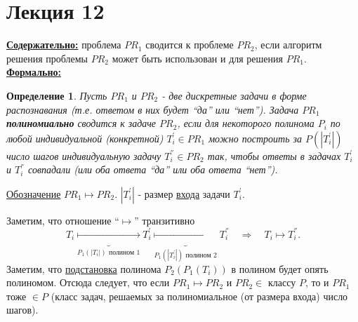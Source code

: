 \documentclass{article}
\newtheorem{definition}{Определение}
\numberwithin{example}{section}
\numberwithin{question}{section}
\numberwithin{Remark}{section}
\numberwithin{theorem}{section}
\numberwithin{definition}{section}
\numberwithin{proposition}{section}
\begin{document}
\section{Лекция 12}
\underline{\textbf{Содержательно:}} проблема $PR_1$ сводится к проблеме $PR_2$, если алгоритм решения проблемы $PR_2$ может быть использован и для решения $PR_1$.\\
\underline{\textbf{Формально:}} 
\begin{definition}
	Пусть $PR_1$ и $PR_2$ - две дискретные задачи в форме распознавания (т.е. ответом в них будет ``да'' или ``нет''). Задача $PR_1$ \textbf{полиномиально} сводится к задаче $PR_2$, если для некоторого полинома $P_i$ по любой индивидуальной (конкретной) $T_i^{'}\in PR_1$ можно построить за $P(|T_i^{'}|)$ число шагов индивидуальную задачу $T_i^{''}\in PR_2$ так, чтобы ответы в задачах $T_i^{'}$ и $T_i^{''}$ совпадали (или оба ответа ``да'' или оба ответа ``нет'').
\end{definition}
\underline{Обозначение} $PR_1\mapsto PR_2$. $|T_i^{'}|$ - размер \underline{входа} задачи $T_i^{'}$.

Заметим, что отношение ``$\mapsto$'' транзитивно
\begin{equation*}
T_i\underbrace{\mapsto}_{P_1(|T_i|)\text{ полином 1}} T_i^{'}\underbrace{\mapsto}_{P_1(|T_i^{'}|)\text{ полином 2}} T_i^{''} \quad \Rightarrow\quad  T_i\mapsto T_i^{''}.
\end{equation*}
Заметим, что \underline{подстановка} полинома $P_2(P_1(T_i))$ в полином будет опять полиномом. Отсюда следует, что если $PR_1\mapsto PR_2$ и $PR_2\in$ классу $P$, то и $PR_1$ тоже $\in P$ (класс задач, решаемых за полиномиальное (от размера входа) число шагов).
\end{document}
